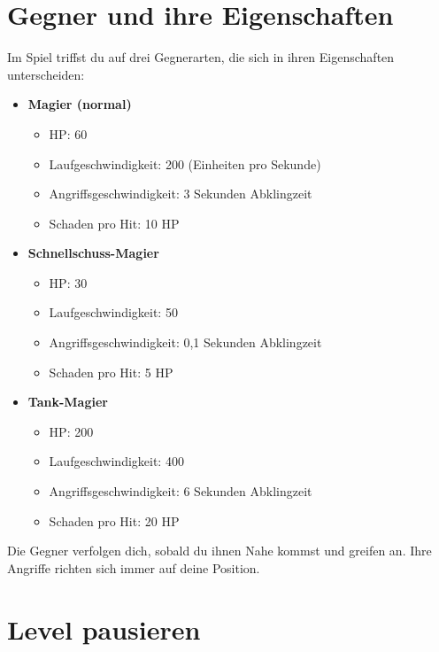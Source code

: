 \documentclass[a4paper,12pt]{article}
\begin{document}
\newpage

\section{Gegner und ihre Eigenschaften}
\label{sec:gegner}

Im Spiel triffst du auf drei Gegnerarten, die sich in ihren Eigenschaften unterscheiden:

\begin{itemize}
    \item \textbf{Magier (normal)}
        \begin{itemize}
            \item HP: 60
            \item Laufgeschwindigkeit: 200 (Einheiten pro Sekunde)
            \item Angriffsgeschwindigkeit: 3 Sekunden Abklingzeit
            \item Schaden pro Hit: 10 HP
        \end{itemize}
    \item \textbf{Schnellschuss-Magier}
        \begin{itemize}
            \item HP: 30
            \item Laufgeschwindigkeit: 50
            \item Angriffsgeschwindigkeit: 0,1 Sekunden Abklingzeit
            \item Schaden pro Hit: 5 HP
        \end{itemize}
    \item \textbf{Tank-Magier}
        \begin{itemize}
            \item HP: 200
            \item Laufgeschwindigkeit: 400
            \item Angriffsgeschwindigkeit: 6 Sekunden Abklingzeit
            \item Schaden pro Hit: 20 HP
        \end{itemize}
\end{itemize}

Die Gegner verfolgen dich, sobald du ihnen Nahe kommst und greifen an. Ihre Angriffe richten sich immer auf deine Position.

\newpage

\section{Level pausieren}
\label{sec:pause}
\end{document}

